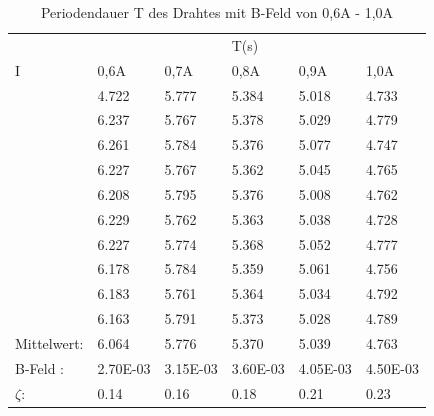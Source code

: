 \begin{table}
    \centering
    \label{tab:tabelle_1}
    \begin{tabular}{p{3cm} | p{1.5cm} p{1.5cm} p{1.5cm} p{1.5cm} p{1.5cm}}
      &      &      & T(s) &      &     \\
    I & 0,6A & 0,7A & 0,8A & 0,9A & 1,0A\\
    \midrule
    & 4.722 &  5.777 &  5.384 &  5.018 &  4.733\\
    & 6.237 &  5.767 &  5.378 &  5.029 &  4.779\\
    & 6.261 &  5.784 &  5.376 &  5.077 &  4.747\\
    & 6.227 &  5.767 &  5.362 &  5.045 &  4.765\\
    & 6.208 &  5.795 &  5.376 &  5.008 &  4.762\\
    & 6.229 &  5.762 &  5.363 &  5.038 &  4.728\\
    & 6.227 &  5.774 &  5.368 &  5.052 &  4.777\\
    & 6.178 &  5.784 &  5.359 &  5.061 &  4.756\\
    & 6.183 &  5.761 &  5.364 &  5.034 &  4.792\\
    & 6.163 &  5.791 &  5.373 &  5.028 &  4.789\\
    \midrule
    Mittelwert:    & 6.064 & 5.776 & 5.370 & 5.039 &  4.763 \\
    \midrule
      
    B-Feld : & 2.70E-03 & 3.15E-03 & 3.60E-03 & 4.05E-03 & 4.50E-03 \\      
    $\zeta$: & 0.14 & 0.16 & 0.18 & 0.21 & 0.23  \\
    \bottomrule
    \end{tabular}
    \caption{Periodendauer T des Drahtes mit B-Feld von 0,6A - 1,0A}
    \label{tab:tabelle_06A}
\end{table}

\label{sec:Auswertung}
